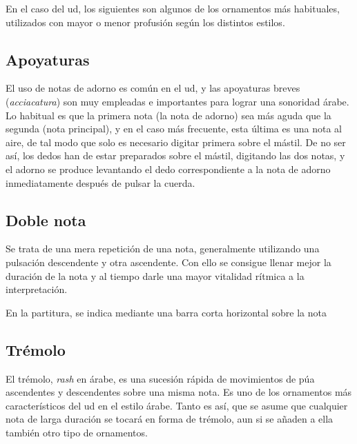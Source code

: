 En el caso del ud, los siguientes son algunos de los ornamentos más habituales, utilizados con mayor o menor profusión según los distintos estilos.


\subsection{Apoyaturas}

El uso de notas de adorno es común en el ud, y las apoyaturas breves (\emph{acciacatura}) son muy empleadas e importantes para lograr una sonoridad árabe. Lo habitual es que la primera nota (la nota de adorno) sea más aguda que la segunda (nota principal), y en el caso más frecuente, esta última es una nota al aire, de tal modo que solo es necesario digitar primera sobre el mástil. De no ser así, los dedos han de estar preparados sobre el mástil, digitando las dos notas, y el adorno se produce levantando el dedo correspondiente a la nota de adorno inmediatamente después de pulsar la cuerda.


\subsection{Doble nota}

Se trata de una mera repetición de una nota, generalmente utilizando una pulsación descendente y otra ascendente. Con ello se consigue llenar mejor la duración de la nota y al tiempo darle una mayor vitalidad rítmica a la interpretación.

En la partitura, se indica mediante una barra corta horizontal sobre la nota


\begin{center}
\end{center}



\subsection{Trémolo}

El trémolo, \emph{rash} en árabe, es una sucesión rápida de movimientos de púa ascendentes y descendentes sobre una misma nota. Es uno de los ornamentos más característicos del ud en el estilo árabe. Tanto es así, que se asume que cualquier nota de larga duración se tocará en forma de trémolo, aun si se añaden a ella también otro tipo de ornamentos.

